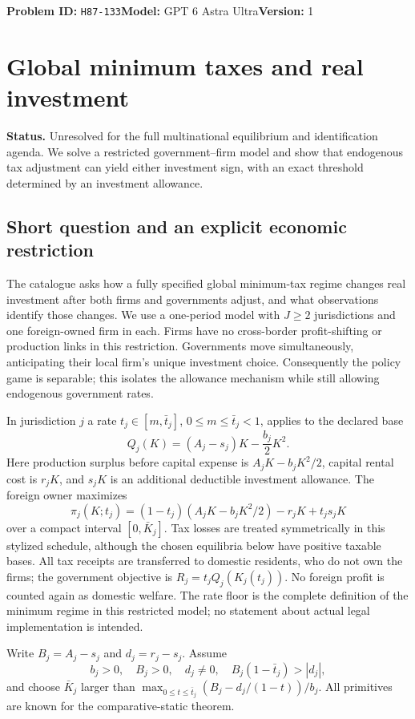 \documentclass[11pt,a4paper]{article}
\begin{document}
\noindent\textbf{Problem ID:} \texttt{H87-133}\quad\textbf{Model:} GPT 6 Astra Ultra\quad\textbf{Version:} 1\par
\section*{Global minimum taxes and real investment}

\textbf{Status.} Unresolved for the full multinational equilibrium and identification agenda. We solve a restricted government--firm model and show that endogenous tax adjustment can yield either investment sign, with an exact threshold determined by an investment allowance.

\subsection*{Short question and an explicit economic restriction}
The catalogue asks how a fully specified global minimum-tax regime changes real investment after both firms and governments adjust, and what observations identify those changes. We use a one-period model with $J\geq2$ jurisdictions and one foreign-owned firm in each. Firms have no cross-border profit-shifting or production links in this restriction. Governments move simultaneously, anticipating their local firm's unique investment choice. Consequently the policy game is separable; this isolates the allowance mechanism while still allowing endogenous government rates.

In jurisdiction $j$ a rate $t_j\in[m,\bar t_j]$, $0\leq m\leq\bar t_j<1$, applies to the declared base
\[
 Q_j(K)=(A_j-s_j)K-\frac{b_j}{2}K^2.
\]
Here production surplus before capital expense is $A_jK-b_jK^2/2$, capital rental cost is $r_jK$, and $s_jK$ is an additional deductible investment allowance. The foreign owner maximizes
\[
 \pi_j(K;t_j)=(1-t_j)(A_jK-b_jK^2/2)-r_jK+t_js_jK
\]
over a compact interval $[0,\bar K_j]$. Tax losses are treated symmetrically in this stylized schedule, although the chosen equilibria below have positive taxable bases. All tax receipts are transferred to domestic residents, who do not own the firms; the government objective is $R_j=t_jQ_j(K_j(t_j))$. No foreign profit is counted again as domestic welfare. The rate floor is the complete definition of the minimum regime in this restricted model; no statement about actual legal implementation is intended.

Write $B_j=A_j-s_j$ and $d_j=r_j-s_j$. Assume
\[
 b_j>0,\quad B_j>0,\quad d_j\ne0,\quad
 B_j(1-\bar t_j)>|d_j|,
\]
and choose $\bar K_j$ larger than $\max_{0\leq t\leq\bar t_j}(B_j-d_j/(1-t))/b_j$. All primitives are known for the comparative-static theorem.
\end{document}
